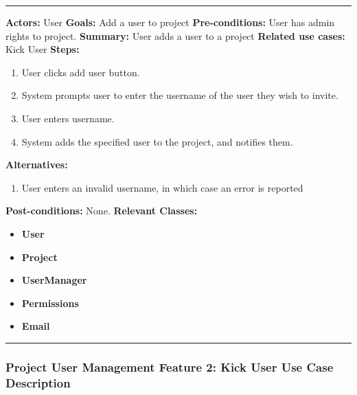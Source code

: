 \documentclass[twoside,letterpaper]{article}
\begin{document}
	\vspace{2pt}
	\hrule
	\vspace{8pt}
	 \textbf{Actors:} User \newline
	\textbf{Goals:} Add a user to project \newline
	 \textbf{Pre-conditions:} User has admin rights to project. \newline
	 \textbf{Summary:} User adds a user to a project \newline
	\textbf{Related use cases:} Kick User \newline
	\textbf{Steps:} \begin{enumerate}
	  \item User clicks add user button.
	  \item System prompts user to enter the username of the user they wish to invite.
	  \item User enters username.
	  \item System adds the specified user to the project, and notifies them.
	 \end{enumerate}
	 \textbf{Alternatives:} \begin{enumerate}
	  \item User enters an invalid username, in which case an error is reported
	 \end{enumerate}
	 \textbf{Post-conditions:} None. \newline
	\vspace{8pt}
	\textbf{Relevant Classes:}
	\begin{itemize}
		\item \textbf{User}
		\item \textbf{Project}
		\item \textbf{UserManager}
		\item \textbf{Permissions}
		\item \textbf{Email}
	\end{itemize}
	\hrule
	\newpage
	
	\subsubsection[Project User Management Feature 2: Kick User Use Case Description]{\rmfamily\bfseries\color{black}
		Project User Management Feature 2: Kick User Use Case Description}
	\hypertarget{RefHeading22059017292}{}
	
\end{document}

